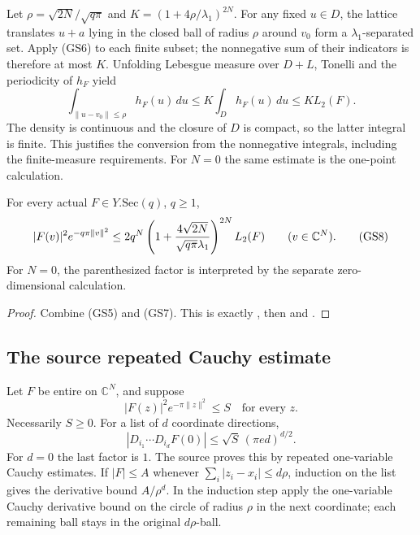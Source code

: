 Let \(\rho=\sqrt{2N}/\sqrt{q\pi}\) and
\(K=(1+4\rho/\lambda_1)^{2N}\).
For any fixed \(u\in D\), the lattice translates \(u+a\) lying
in the closed ball of radius \(\rho\) around \(v_0\) form a
\(\lambda_1\)-separated set.
Apply (GS6) to each finite subset; the nonnegative sum of their
indicators is therefore at most \(K\).
Unfolding Lebesgue measure over \(D+L\), Tonelli and the
periodicity of \(h_F\) yield
\[
 \int_{\|u-v_0\|\le\rho}h_F(u)\,du
   \le K\int_Dh_F(u)\,du\le K L_2(F).
 \tag{GS7}\label{eq:sr-source-ball-cover}
\]
The density is continuous and the closure of \(D\) is compact,
so the latter integral is finite.
This justifies the conversion from the nonnegative integrals,
including the finite-measure requirements.
For \(N=0\) the same estimate is the one-point calculation.

\begin{srproposition}\label{prop:sr-source-gaussian-sup}
For every actual \(F\in Y.\mathrm{Sec}(q)\), \(q\ge1\),
\[
 |F(v)|^2e^{-q\pi\|v\|^2}
 \le 2q^N
       \left(1+{4\sqrt{2N}\over\sqrt{q\pi}\lambda_1}\right)^{2N}
                     L_2(F)\qquad(v\in\mathbb C^N).
 \tag{GS8}\label{eq:sr-source-gaussian-sup}
\]
For \(N=0\), the parenthesized factor is interpreted by the
separate zero-dimensional calculation.
\end{srproposition}
\begin{proof}
Combine (GS5) and (GS7).
This is exactly , then
 and .
\end{proof}

\subsection{The source repeated Cauchy estimate}
Let \(F\) be entire on \(\mathbb C^N\), and suppose
\[
                   |F(z)|^2e^{-\pi\|z\|^2}\le S
                                      \quad\text{for every }z.
\]
Necessarily \(S\ge0\).
For a list of \(d\) coordinate directions,
\[
 |D_{i_1}\cdots D_{i_d}F(0)|
                   \le\sqrt S\,(\pi e d)^{d/2}.
 \tag{GS9}\label{eq:sr-source-Gaussian-Cauchy}
\]
For \(d=0\) the last factor is \(1\).
The source proves this by repeated one-variable Cauchy estimates.
If \(|F|\le A\) whenever \(\sum_i|z_i-x_i|\le d\rho\), induction
on the list gives the derivative bound \(A/\rho^d\).
In the induction step apply the one-variable Cauchy derivative
bound on the circle of radius \(\rho\) in the next coordinate;
each remaining ball stays in the original \(d\rho\)-ball.

